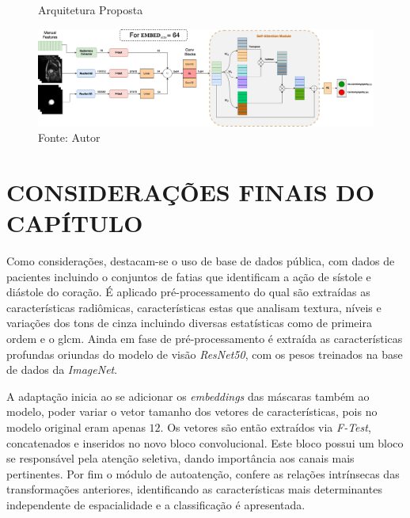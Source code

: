 \begin{figure}[H]
    \centering
    \caption{Arquitetura Proposta}
    \includegraphics[width=1.02\textwidth]{figures/fig011.png}
    \caption*{Fonte: Autor}
    \label{fig:fig011}
\end{figure}

\section{CONSIDERAÇÕES FINAIS DO CAPÍTULO}
\label{sec:cap4_consideracoes_finais}

Como considerações, destacam-se o uso de base de dados pública, com dados de pacientes incluindo o conjuntos de fatias que identificam a ação de sístole e diástole do coração. É aplicado pré-processamento do qual são extraídas as características radiômicas, características estas que analisam textura, níveis e variações dos tons de cinza incluindo diversas estatísticas como de primeira ordem e o \gls{glcm}. Ainda em fase de pré-processamento é extraída as características profundas oriundas do modelo de visão \textit{ResNet50}, com os pesos treinados na base de dados da \textit{ImageNet}. 

A adaptação inicia ao se adicionar os \textit{embeddings} das máscaras também ao modelo, poder variar o vetor tamanho dos vetores de características, pois no modelo original eram apenas $12$. Os vetores são então extraídos via \textit{F-Test}, concatenados e inseridos no novo bloco convolucional. Este bloco possui um bloco \gls{se} responsável pela atenção seletiva, dando importância aos canais mais pertinentes. Por fim o módulo de autoatenção, confere as relações intrínsecas das transformações anteriores, identificando as características mais determinantes independente de espacialidade e a classificação é apresentada.